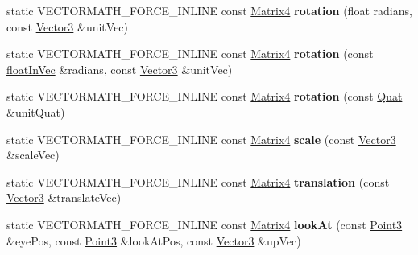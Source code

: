 \begin{DoxyCompactItemize}
\mbox{\label{classVectormath_1_1Aos_1_1Matrix4_a9ca83ed9445fff0adf8c87ed8453ce58}} 
static V\+E\+C\+T\+O\+R\+M\+A\+T\+H\+\_\+\+F\+O\+R\+C\+E\+\_\+\+I\+N\+L\+I\+NE const \hyperlink{classVectormath_1_1Aos_1_1Matrix4}{Matrix4} {\bfseries rotation} (float radians, const \hyperlink{classVectormath_1_1Aos_1_1Vector3}{Vector3} \&unit\+Vec)
\item 
\mbox{\label{classVectormath_1_1Aos_1_1Matrix4_aa675b03510d2410b850cf2db30d4084f}} 
static V\+E\+C\+T\+O\+R\+M\+A\+T\+H\+\_\+\+F\+O\+R\+C\+E\+\_\+\+I\+N\+L\+I\+NE const \hyperlink{classVectormath_1_1Aos_1_1Matrix4}{Matrix4} {\bfseries rotation} (const \hyperlink{classVectormath_1_1floatInVec}{float\+In\+Vec} \&radians, const \hyperlink{classVectormath_1_1Aos_1_1Vector3}{Vector3} \&unit\+Vec)
\item 
\mbox{\label{classVectormath_1_1Aos_1_1Matrix4_ae72b79063c70eaa00e504966a2b56f1f}} 
static V\+E\+C\+T\+O\+R\+M\+A\+T\+H\+\_\+\+F\+O\+R\+C\+E\+\_\+\+I\+N\+L\+I\+NE const \hyperlink{classVectormath_1_1Aos_1_1Matrix4}{Matrix4} {\bfseries rotation} (const \hyperlink{classVectormath_1_1Aos_1_1Quat}{Quat} \&unit\+Quat)
\item 
\mbox{\label{classVectormath_1_1Aos_1_1Matrix4_a90f7ba57a31c662b516bdb013306866b}} 
static V\+E\+C\+T\+O\+R\+M\+A\+T\+H\+\_\+\+F\+O\+R\+C\+E\+\_\+\+I\+N\+L\+I\+NE const \hyperlink{classVectormath_1_1Aos_1_1Matrix4}{Matrix4} {\bfseries scale} (const \hyperlink{classVectormath_1_1Aos_1_1Vector3}{Vector3} \&scale\+Vec)
\item 
\mbox{\label{classVectormath_1_1Aos_1_1Matrix4_ae8eb0b5856de781d6a28aba7f7237b4a}} 
static V\+E\+C\+T\+O\+R\+M\+A\+T\+H\+\_\+\+F\+O\+R\+C\+E\+\_\+\+I\+N\+L\+I\+NE const \hyperlink{classVectormath_1_1Aos_1_1Matrix4}{Matrix4} {\bfseries translation} (const \hyperlink{classVectormath_1_1Aos_1_1Vector3}{Vector3} \&translate\+Vec)
\item 
\mbox{\label{classVectormath_1_1Aos_1_1Matrix4_a2b66c9f91bd1e3a655091421379e5ec1}} 
static V\+E\+C\+T\+O\+R\+M\+A\+T\+H\+\_\+\+F\+O\+R\+C\+E\+\_\+\+I\+N\+L\+I\+NE const \hyperlink{classVectormath_1_1Aos_1_1Matrix4}{Matrix4} {\bfseries look\+At} (const \hyperlink{classVectormath_1_1Aos_1_1Point3}{Point3} \&eye\+Pos, const \hyperlink{classVectormath_1_1Aos_1_1Point3}{Point3} \&look\+At\+Pos, const \hyperlink{classVectormath_1_1Aos_1_1Vector3}{Vector3} \&up\+Vec)

\end{DoxyCompactItemize}

